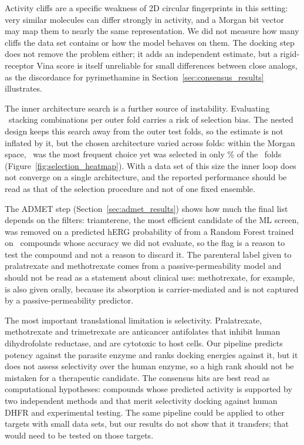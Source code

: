 Activity cliffs are a specific weakness of 2D circular fingerprints in this setting: very similar molecules can differ strongly in activity, and a Morgan bit vector may map them to nearly the same representation. We did not measure how many cliffs the data set contains or how the model behaves on them. The docking step does not remove the problem either; it adds an independent estimate, but a rigid-receptor Vina score is itself unreliable for small differences between close analogs, as the discordance for pyrimethamine in Section~\ref{sec:consensus_results} illustrates.

The inner architecture search is a further source of instability. Evaluating \NArchitectureCombos\ stacking combinations per outer fold carries a risk of selection bias. The nested design keeps this search away from the outer test folds, so the estimate is not inflated by it, but the chosen architecture varied across folds: within the Morgan space, \MorganBestArchitecture\ was the most frequent choice yet was selected in only \MorganStability\% of the \TotalOuterFolds\ folds (Figure~\ref{fig:selection_heatmap}). With a data set of this size the inner loop does not converge on a single architecture, and the reported performance should be read as that of the selection procedure and not of one fixed ensemble.

The ADMET step (Section~\ref{sec:admet_results}) shows how much the final list depends on the filters: triamterene, the most efficient candidate of the ML screen, was removed on a predicted hERG probability of \AdmetHergTriamterene{} from a Random Forest trained on \AdmetNHergTrain\ compounds whose accuracy we did not evaluate, so the flag is a reason to test the compound and not a reason to discard it. The parenteral label given to pralatrexate and methotrexate comes from a passive-permeability model and should not be read as a statement about clinical use: methotrexate, for example, is also given orally, because its absorption is carrier-mediated and is not captured by a passive-permeability predictor.

The most important translational limitation is selectivity. Pralatrexate, methotrexate and trimetrexate are anticancer antifolates that inhibit human dihydrofolate reductase, and are cytotoxic to host cells. Our pipeline predicts potency against the parasite enzyme and ranks docking energies against it, but it does not assess selectivity over the human enzyme, so a high rank should not be mistaken for a therapeutic candidate. The consensus hits are best read as computational hypotheses: compounds whose predicted activity is supported by two independent methods and that merit selectivity docking against human DHFR and experimental testing. The same pipeline could be applied to other targets with small data sets, but our results do not show that it transfers; that would need to be tested on those targets.
